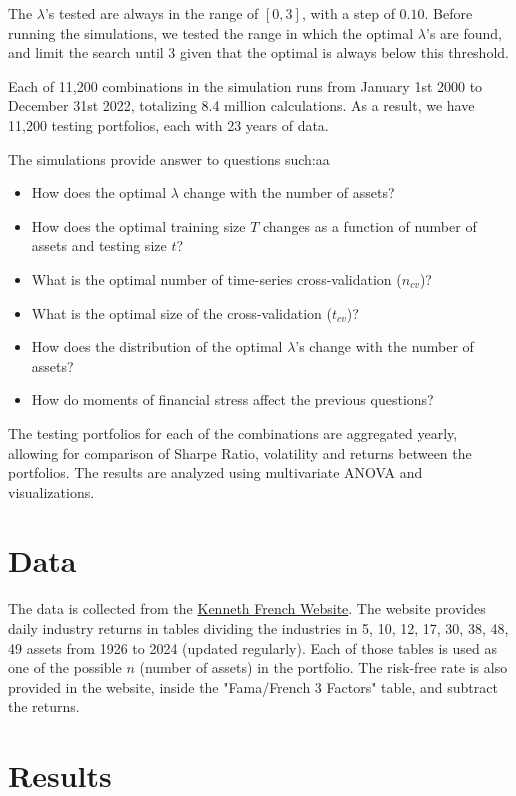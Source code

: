 \documentclass{article}
\begin{document}
The $\lambda$'s tested are always in the range of $[0, 3]$, with a step of $0.10$. Before running the simulations, we tested the range in which the optimal $\lambda$'s are found, and limit the search until $3$ given that the optimal is always below this threshold.

Each of 11,200 combinations in the simulation runs from January 1st 2000 to December 31st 2022, totalizing 8.4 million calculations. As a result, we have 11,200 testing portfolios, each with 23 years of data.

The simulations provide answer to questions such:aa
\begin{itemize}
    \item How does the optimal $\lambda$ change with the number of assets?
    \item How does the optimal training size $T$ changes as a function of number of assets and testing size $t$?
    \item What is the optimal number of time-series cross-validation ($n_{cv}$)?
    \item What is the optimal size of the cross-validation ($t_{cv}$)?
    \item How does the distribution of the optimal $\lambda$'s change with the number of assets?
    \item How do moments of financial stress affect the previous questions?
\end{itemize}

The testing portfolios for each of the combinations are aggregated yearly, allowing for comparison of Sharpe Ratio, volatility and returns between the portfolios. The results are analyzed using multivariate ANOVA and visualizations.

\section{Data}
The data is collected from the \hyperlink{https://mba.tuck.dartmouth.edu/pages/faculty/ken.french/data_library.html}{Kenneth French Website}. The website provides daily industry returns in tables dividing the industries in 5, 10, 12, 17, 30, 38, 48, 49 assets from 1926 to 2024 (updated regularly). Each of those tables is used as one of the possible $n$ (number of assets) in the portfolio. The risk-free rate is also provided in the website, inside the "Fama/French 3 Factors" table, and subtract the returns.

\section{Results}
\end{document}
